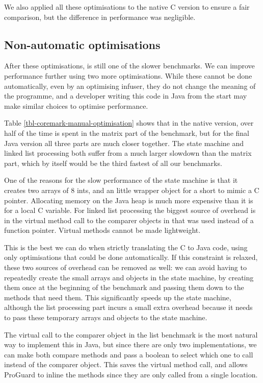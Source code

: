 We also applied all these optimisations to the native C version to ensure a fair comparison, but the difference in performance was negligible.

\subsection{Non-automatic optimisations}
\label{sec-evaluation-coremark-non-automatic-optimisations}
After these optimisations,  is still one of the slower benchmarks. We can improve performance further using two more optimisations. While these cannot be done automatically, even by an optimising infuser, they do not change the meaning of the programme, and a developer writing this code in Java from the start may make similar choices to optimise performance.

Table \ref{tbl-coremark-manual-optimisation} shows that in the native version, over half of the time is spent in the matrix part of the benchmark, but for the final Java version all three parts are much closer together. The state machine and linked list processing both suffer from a much larger slowdown than the matrix part, which by itself would be the third fastest of all our benchmarks.

One of the reasons for the slow performance of the state machine is that it creates two arrays of 8 ints, and an little wrapper object for a short to mimic a C pointer. Allocating memory on the Java heap is much more expensive than it is for a local C variable. For linked list processing the biggest source of overhead is in the virtual method call to the comparer objects in  that was used instead of a function pointer. Virtual methods cannot be made lightweight.

This is the best we can do when strictly translating the C to Java code, using only optimisations that could be done automatically. If this constraint is relaxed, these two sources of overhead can be removed as well: we can avoid having to repeatedly create the small arrays and objects in the state machine, by creating them once at the beginning of the benchmark and passing them down to the methods that need them. This significantly speeds up the state machine, although the list processing part incurs a small extra overhead because it needs to pass these temporary arrays and objects to the state machine.

The virtual call to the comparer object in the list benchmark is the most natural way to implement this in Java, but since there are only two implementations, we can make both compare methods  and pass a boolean to select which one to call instead of the comparer object. This saves the virtual method call, and allows ProGuard to inline the methods since they are only called from a single location.

